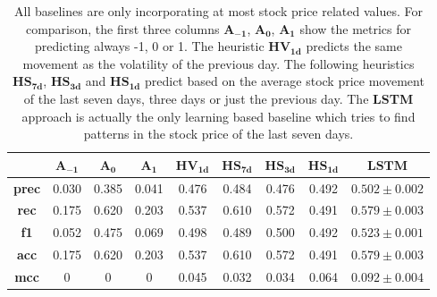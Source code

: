 \begin{table*}[!ht]
    \centering
    \setlength{\tabcolsep}{0pt} %
    
    \begin{tabular*}{\textwidth}{@{\extracolsep{\fill}}ccccccccc}
        \toprule
        {} &     $\mathbf{A_{-1}}$ &      $\mathbf{A_{0}}$ &      $\mathbf{A_{1}}$ &    $\mathbf{HV_{1d}}$ &    $\mathbf{HS_{7d}}$ &    $\mathbf{HS_{3d}}$ &    $\mathbf{HS_{1d}}$ &                $\mathbf{LSTM}$ \\
        \midrule
        \textbf{prec} &  0.030 &  0.385 &  0.041 &  0.476 &  0.484 &   0.476 &  0.492 &  $0.502 \pm 0.002$ \\
        \textbf{rec } &  0.175 &  0.620 &  0.203 &  0.537 &  0.610 &  0.572 &  0.491 &  $0.579 \pm 0.003$ \\
        \textbf{f1  } &  0.052 &  0.475 &  0.069 &  0.498 &  0.489 &  0.500 &  0.492 &  $0.523 \pm 0.001$ \\
        \textbf{acc } &  0.175 &  0.620 &  0.203 &  0.537 &  0.610 &  0.572 &  0.491 &  $0.579 \pm 0.003$ \\
        \textbf{mcc } &        0 &        0 &        0 &  0.045 &  0.032 &  0.034 &  0.064 &  $0.092 \pm 0.004$ \\
        \bottomrule
    \end{tabular*}

    \caption{All baselines are only incorporating at most stock price related values. For comparison, the first three columns $\mathbf{A_{-1}}$, $\mathbf{A_{0}}$, $\mathbf{A_{1}}$ show the metrics for predicting always -1, 0 or 1. The heuristic $\mathbf{HV_{1d}}$ predicts the same movement as the volatility of the previous day. The following heuristics $\mathbf{HS_{7d}}$, $\mathbf{HS_{3d}}$ and $\mathbf{HS_{1d}}$ predict based on the average stock price movement of the last seven days, three days or just the previous day. The \textbf{LSTM} approach is actually the only learning based baseline which tries to find patterns in the stock price of the last seven days.}
    \label{table:baselines}
\end{table*}
